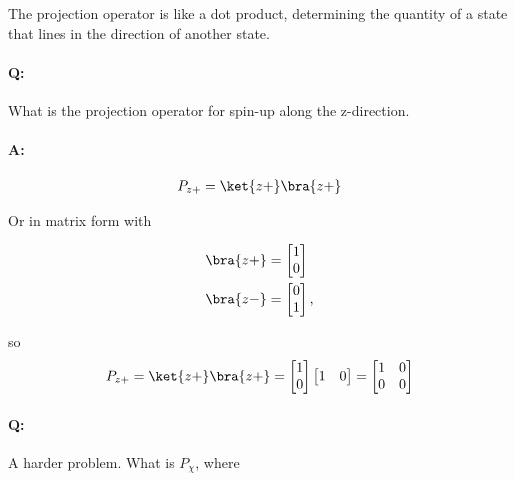 The projection operator is like a dot product, determining the quantity of a state that lines in the direction of another state.

\paragraph{Q:} What is the projection operator for spin-up along the z-direction.
\paragraph{A:}

\begin{equation}\label{eqn:PHY356HNov2:100}
\begin{aligned}
P_{z+} = \ket{z+}\bra{z+}
\end{aligned}
\end{equation}

Or in matrix form with

\begin{equation}\label{eqn:PHY356HNov2:105}
\begin{aligned}
\bra{z+} &=
\begin{bmatrix}
1 \\
0
\end{bmatrix} \\
\bra{z-} &=
\begin{bmatrix}
0 \\
1
\end{bmatrix},
\end{aligned}
\end{equation}

so
\begin{equation}\label{eqn:PHY356HNov2:110}
\begin{aligned}
P_{z+} = \ket{z+}\bra{z+} =
\begin{bmatrix}
1 \\
0
\end{bmatrix}
\begin{bmatrix}
1 & 0
\end{bmatrix}
=
\begin{bmatrix}
1 & 0 \\
0 & 0
\end{bmatrix}
\end{aligned}
\end{equation}

\paragraph{Q:} A harder problem.  What is \(P_\chi\), where

